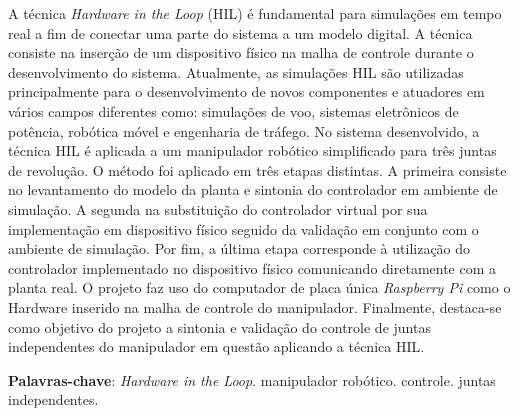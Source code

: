\setlength{\absparsep}{18pt} %
\begin{resumo}
  A técnica \textit{Hardware in the Loop} (HIL) é fundamental para simulações em tempo real a fim de conectar uma parte 
  do sistema a um modelo digital. A técnica consiste na inserção de um dispositivo físico na malha de controle
  durante o desenvolvimento do sistema. Atualmente, as simulações HIL são utilizadas principalmente para o 
  desenvolvimento de novos componentes e atuadores em vários campos diferentes como: simulações de voo, 
  sistemas eletrônicos de potência, robótica móvel e engenharia de tráfego. No sistema desenvolvido, a técnica 
  HIL é aplicada a um manipulador robótico simplificado para três juntas de revolução. O método foi aplicado em 
  três etapas distintas. A primeira consiste no levantamento do modelo da planta e sintonia do controlador em 
  ambiente de simulação. A segunda na substituição do controlador virtual por sua implementação em dispositivo 
  físico seguido da validação em conjunto com o ambiente de simulação. Por fim, a última etapa corresponde à 
  utilização do controlador implementado no dispositivo físico comunicando diretamente com a planta real. O projeto
  faz uso do computador de placa única \textit{Raspberry Pi} como o Hardware inserido na malha de controle do manipulador.
  Finalmente, destaca-se como objetivo do projeto a sintonia e validação do controle de juntas independentes do
  manipulador em questão aplicando a técnica HIL.
  
 \textbf{Palavras-chave}: \textit{Hardware in the Loop}. manipulador robótico. controle. juntas independentes.
\end{resumo}